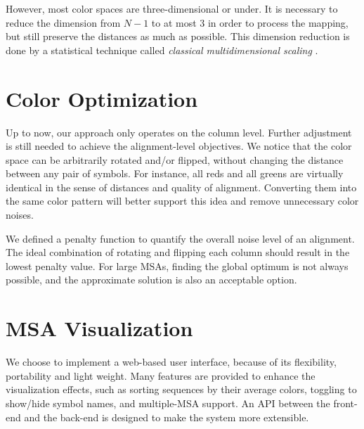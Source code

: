 However, most color spaces are three-dimensional or under. It is necessary to reduce the dimension from $N-1$ to at most 3 in order to process the mapping, but still preserve the distances as much as possible. This dimension reduction is done by a statistical technique called \emph{classical multidimensional scaling} \cite{Borg:1997aa}.

\section{Color Optimization}

Up to now, our approach only operates on the column level. Further adjustment is still needed to achieve the alignment-level objectives. We notice that the color space can be arbitrarily rotated and/or flipped, without changing the distance between any pair of symbols. For instance, all reds and all greens are virtually identical in the sense of distances and quality of alignment. Converting them into the same color pattern will better support this idea and remove unnecessary color noises.

We defined a penalty function to quantify the overall noise level of an alignment. The ideal combination of rotating and flipping each column should result in the lowest penalty value. For large MSAs, finding the global optimum is not always possible, and the approximate solution is also an acceptable option.

\section{MSA Visualization}

We choose to implement a web-based user interface, because of its flexibility, portability and light weight. Many features are provided to enhance the visualization effects, such as sorting sequences by their average colors, toggling to show/hide symbol names, and multiple-MSA support. An API between the front-end and the back-end is designed to make the system more extensible.